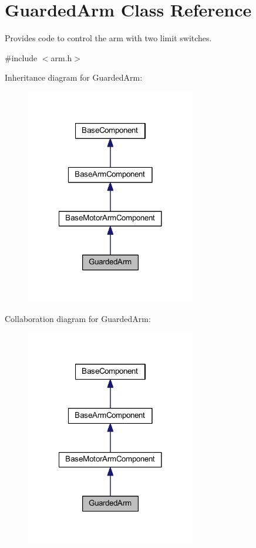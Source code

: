 \hypertarget{class_guarded_arm}{\section{\-Guarded\-Arm \-Class \-Reference}
\label{class_guarded_arm}
}


\-Provides code to control the arm with two limit switches.  




{\ttfamily \#include $<$arm.\-h$>$}



\-Inheritance diagram for \-Guarded\-Arm\-:\nopagebreak
\begin{figure}[H]
\begin{center}
\leavevmode
\includegraphics[width=210pt]{class_guarded_arm__inherit__graph}
\end{center}
\end{figure}


\-Collaboration diagram for \-Guarded\-Arm\-:\nopagebreak
\begin{figure}[H]
\begin{center}
\leavevmode
\includegraphics[width=210pt]{class_guarded_arm__coll__graph}
\end{center}
\end{figure}
